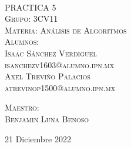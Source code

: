 \begin{titlepage}
\begin{minipage}[c][0.81\textheight][t]{0.25\textwidth}
\begin{center}
    \end{center}
  \end{minipage}
  \begin{minipage}[c][0.81\textheight][t]{0.75\textwidth}
    \begin{center}
      \vspace{1cm}

      {\color{black}{\large\scshape Semestre 2023-1}}\\[.2in]

      \vspace{0.5cm}            

      \textsc{\LARGE PRACTICA 5}\\[1.5cm]
      \textsc{\large Grupo: 3CV11}\\[0.5cm]
      \textsc{\large Materia: Análisis de Algoritmos}\\[0.5cm]
      
      {\color{black}\textsc{\large Alumnos:}}\\[0.5cm]
      \textsc{\large {Isaac Sánchez Verdiguel}}\\[1cm]
      \textsc{ {isanchezv1603@alumno.ipn.mx}}\\[1cm]   
      \textsc{\large {Axel Treviño Palacios}}\\[1cm]
      \textsc{ {atrevinop1500@alumno.ipn.mx}}\\[1cm]   
      
      
      
      \vspace{0.5cm}

      {\large\scshape 
        {\color{black}Maestro:}\\[0.3cm] {Benjamin Luna Benoso}}\\[.2in]

      \vspace{0.5cm}
       
      \large{21 Diciembre 2022}
    \end{center}
  \end{minipage}
\end{titlepage}
